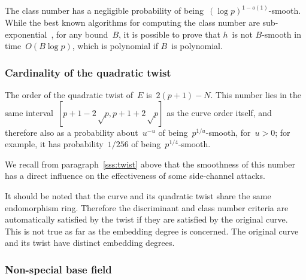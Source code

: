 \documentclass[twocolumn,letterpaper,10pt]{article}
\DeclareMathOperator\Cl{Cl}
\begin{document}
\medbreak

The class number has a negligible probability
of being~$(\log p)^{1-o(1)}$-smooth.
While the best known algorithms for computing the class number
are sub-exponential~\cite{ams1989hmc,chile2009biasse},
for any bound~$B$,
it is possible to prove that $h$~is not $B$-smooth
in time~$O(B \log p)$,
which is polynomial if $B$~is polynomial.


\subsubsection{Cardinality of the quadratic twist}
\label{sss:normal-twist}

The order of the quadratic twist of~$E$ is~$2(p+1) - N$.
This number lies in the same interval~$[p+1-2√p, p+1+2√p]$
as the curve order itself,
and therefore also as a probability about~$u^{-u}$
of being~$p^{1/u}$-smooth, for~$u > 0$;
for example, it has probability~$1/256$ of being~$p^{1/4}$-smooth.

We recall from paragraph~\ref{sss:twist} above
that the smoothness of this number has a direct influence
on the effectiveness of some side-channel attacks.

It should be noted that the curve and its quadratic twist
share the same endomorphism ring.
Therefore the discriminant and class number criteria
are automatically satisfied by the twist
if they are satisfied by the original curve.
This is not true as far as the embedding degree is concerned.
The original curve and its twist have distinct embedding degrees.

\subsubsection{Non-special base field}
\label{sss:special-anormal}
\end{document}

